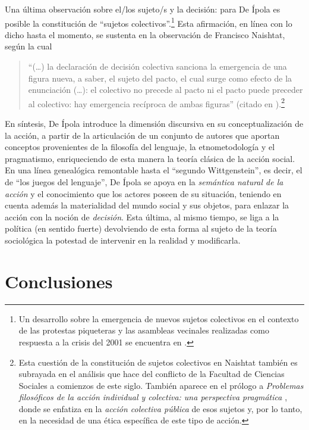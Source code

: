 {Una última observación sobre el/los sujeto/s y la decisión: para De Ípola es posible la constitución de \enquote{sujetos colectivos}.\footnote{Un desarrollo sobre la emergencia de nuevos sujetos colectivos en el contexto de las protestas piqueteras y las asambleas vecinales realizadas como respuesta a la crisis del 2001 se encuentra en \textcite{1611-DEIPOLA2004}.} Esta afirmación, en línea con lo dicho hasta el momento, se sustenta en la observación de Francisco Naishtat, según la cual

\begin{quote}
\enquote{(\dots) la declaración de decisión colectiva sanciona la emergencia de una figura nueva, a saber, el sujeto del pacto, el cual surge como efecto de la enunciación (\dots): el colectivo no precede al pacto ni el pacto puede preceder al colectivo: hay emergencia recíproca de ambas figuras} (citado en \cite[83]{1600-DEIPOLA2001}).\footnote{Esta cuestión de la constitución de sujetos colectivos en Naishtat también es subrayada en el análisis que \textcite{1603-DEIPOLA2004} hace del conflicto de la Facultad de Ciencias Sociales a comienzos de este siglo. También aparece en el prólogo a \emph{Problemas filosóficos de la acción individual y colectiva: una perspectiva pragmática} \parencite{1612-DEIPOLA2005}, donde se enfatiza en la \emph{acción colectiva pública} de esos sujetos y, por lo tanto, en la necesidad de una ética específica de este tipo de acción.}
\end{quote}

En síntesis, De Ípola introduce la dimensión discursiva en su conceptualización de la acción, a partir de la articulación de un conjunto de autores que aportan conceptos provenientes de la filosofía del lenguaje, la etnometodología y el pragmatismo, enriqueciendo de esta manera la teoría clásica de la acción social. En una línea genealógica remontable hasta el \enquote{segundo Wittgenstein}, es decir, el de \enquote{los juegos del lenguaje}, De Ípola se apoya en la \emph{semántica natural de la acción} y el conocimiento que los actores poseen de su situación, teniendo en cuenta además la materialidad del mundo social y sus objetos, para enlazar la acción con la noción de \emph{decisión}. Esta última, al mismo tiempo, se liga a la política (en sentido fuerte) devolviendo de esta forma al sujeto de la teoría sociológica la potestad de intervenir en la realidad y modificarla.

\section{Conclusiones}

}
